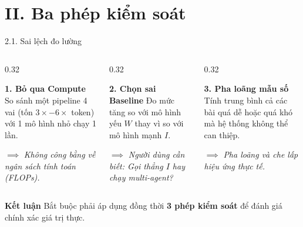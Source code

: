 \documentclass[aspectratio=169,10pt]{beamer}
\begin{document}
\section{II. Ba phép kiểm soát}

\begin{frame}{2.1. Sai lệch đo lường}
  \begin{columns}[c]
    \begin{column}{0.32\textwidth}
      \begin{alertblock}{\textbf{1. Bỏ qua Compute}}
        \small
        So sánh một pipeline 4 vai (tốn $3\times - 6\times$ token) với 1 mô hình nhỏ chạy 1 lần.
        \vspace{4pt}
        
        $\implies$ \textit{Không công bằng về ngân sách tính toán (FLOPs).}
      \end{alertblock}
    \end{column}
    
    \begin{column}{0.32\textwidth}
      \begin{alertblock}{\textbf{2. Chọn sai Baseline}}
        \small
        Đo mức tăng so với mô hình yếu $W$ thay vì so với mô hình mạnh $I$.
        \vspace{4pt}
        
        $\implies$ \textit{Người dùng cần biết: Gọi thẳng $I$ hay chạy multi-agent?}
      \end{alertblock}
    \end{column}
    
    \begin{column}{0.32\textwidth}
      \begin{alertblock}{\textbf{3. Pha loãng mẫu số}}
        \small
        Tính trung bình cả các bài quá dễ hoặc quá khó mà hệ thống không thể can thiệp.
        \vspace{4pt}
        
        $\implies$ \textit{Pha loãng và che lấp hiệu ứng thực tế.}
      \end{alertblock}
    \end{column}
  \end{columns}
  
  \vspace{10pt}
  \begin{block}{\textbf{Kết luận}}
    \centering\small
    Bắt buộc phải áp dụng đồng thời \textbf{3 phép kiểm soát} để đánh giá chính xác giá trị thực.
  \end{block}
\end{frame}
\end{document}
